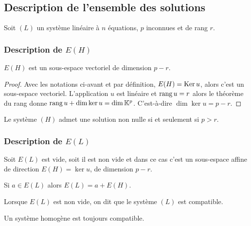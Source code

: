 \subsection{Description de l'ensemble des solutions}

Soit \((L)\) un système linéaire à \(n\) équations, \(p\) inconnues et de rang \(r\).

\subsubsection{Description de \(E(H)\)}

\begin{theo}
  \(E(H)\) est un sous-espace vectoriel de dimension \(p-r\).
\end{theo}
\begin{proof}
  Avec les notations ci-avant et par définition, \(E(H)=\operatorname{Ker} u\), alors c'est un sous-espace vectoriel. L'application \(u\) est linéaire et \(\operatorname{rang} u=r\) alors le théorème du rang donne \(\operatorname{rang} u +\dim \ker u = \dim \mathbb{K}^p\). C'est-à-dire \(\dim \ker u = p-r\).
\end{proof}
\begin{corth}
  Le système \((H)\) admet une solution non nulle si et seulement si \(p>r\).
\end{corth}

\subsubsection{Description de \(E(L)\)}

\begin{theo}
  Soit \(E(L)\) est vide, soit il est non vide et dans ce cas c'est un sous-espace affine de direction \(E(H)=\ker u\), de dimension \(p-r\).

  Si \(a \in E(L)\) alors \(E(L)=a+E(H)\).
\end{theo}
%
\begin{defdef}
  Lorsque \(E(L)\) est non vide, on dit que le système \((L)\) est compatible.
\end{defdef}
%
Un système homogène est toujours compatible.
%
